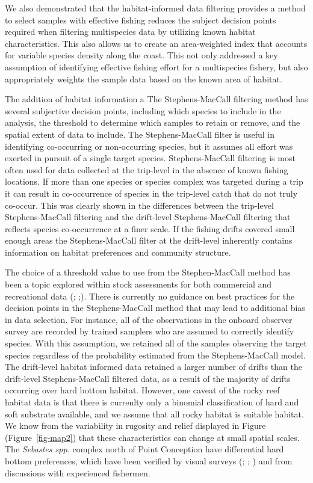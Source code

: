 \documentclass[
  12pt,
  authoryear,
  preprint,
  3p]{elsarticle}
\begin{document}
We also demonstrated that the habitat-informed data filtering provides a
method to select samples with effective fishing reduces the subject
decision points required when filtering multispecies data by utilizing
known habitat characteristics. This also allows us to create an
area-weighted index that accounts for variable species density along the
coast. This not only addressed a key assumption of identifying effective
fishing effort for a multispecies fishery, but also appropriately
weights the sample data based on the known area of habitat.

The addition of habitat information a The Stephens-MacCall filtering
method has several subjective decision points, including which species
to include in the analysis, the threshold to determine which samples to
retain or remove, and the spatial extent of data to include. The
Stephens-MacCall filter is useful in identifying co-occurring or
non-occurring species, but it assumes all effort was exerted in pursuit
of a single target species. Stephens-MacCall filtering is most often
used for data collected at the trip-level in the absence of known
fishing locations. If more than one species or species complex was
targeted during a trip it can result in co-occurrence of species in the
trip-level catch that do not truly co-occur. This was clearly shown in
the differences between the trip-level Stephens-MacCall filtering and
the drift-level Stephens-MacCall filtering that reflects species
co-occurrence at a finer scale. If the fishing drifts covered small
enough areas the Stephens-MacCall filter at the drift-level inherently
contains information on habitat preferences and community structure.

The choice of a threshold value to use from the Stephen-MacCall method
has been a topic explored within stock assessments for both commercial
and recreational data (\citet{Dettloff:2021:ISA};
\citet{Cope:2015:DMS};\citet{DucharmeBarth:2018:IAG}). There is
currently no guidance on best practices for the decision points in the
Stephens-MacCall method that may lead to additional bias in data
selection. For instance, all of the observations in the onboard observer
survey are recorded by trained samplers who are assumed to correctly
identify species. With this assumption, we retained all of the samples
observing the target species regardless of the probability estimated
from the Stephens-MacCall model. The drift-level habitat informed data
retained a larger number of drifts than the drift-level Stephens-MacCall
filtered data, as a result of the majority of drifts occurring over hard
bottom habitat. However, one caveat of the rocky reef habitat data is
that there is currenlty only a binomial classification of hard and soft
substrate available, and we assume that all rocky habitat is suitable
habitat. We know from the variability in rugosity and relief displayed
in Figure (Figure~\ref{fig-map2}) that these characteristics can change
at small spatial scales. The \emph{Sebastes spp.} complex north of Point
Conception have differential hard bottom preferences, which have been
verified by visual surveys (\citet{Laidig:2009:DFH};
\citet{Anderson:2007:MHA}; \citet{Haggarty:2006:CIR} ) and from
discussions with experienced fishermen.
\end{document}
